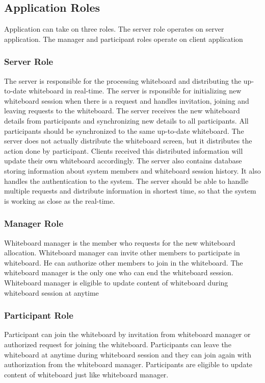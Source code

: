 \documentclass[conference]{IEEEtran}
\begin{document}
\subsection{Application Roles}
Application can take on three roles. The server role operates on server application. The manager and participant roles operate on client application
\subsubsection{Server Role}
The server is responsible for the processing whiteboard and distributing the up-to-date whiteboard in real-time. The server is rsponsible for initializing new whiteboard session when there is a request and handles invitation, joining and leaving requests to the whiteboard. The server receives the new whiteboard details from participants and synchronizing new details to all participants. All participants should be synchronized to the same up-to-date whiteboard. The server does not actually distribute the whiteboard screen, but it distributes the action done by participant. Clients received this distributed information will update their own whiteboard accordingly. The server also contains database storing information about system members and whiteboard session history. It also handles the authentication to the system. The server should be able to handle multiple requests and distribute information in shortest time, so that the system is working as close as the real-time.
\subsubsection{Manager Role}
Whiteboard manager is the member who requests for the new whiteboard allocation. Whiteboard manager can invite other members to participate in whiteboard. He can authorize other members to join in the whiteboard. The whiteboard manager is the only one who can end the whiteboard session. Whiteboard manager is eligible to update content of whiteboard during whiteboard session at anytime
\subsubsection{Participant Role}
Participant can join the whiteboard by invitation from whiteboard manager or authorized request for joining the whiteboard. Participants can leave the whiteboard at anytime during whiteboard session and they can join again with authorization from the whiteboard manager. Participants are eligible to update content of whiteboard just like whiteboard manager.
\end{document}
